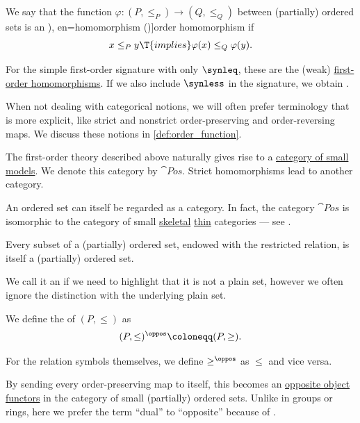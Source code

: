 \begin{definition}
\begin{thmenum}[resume=def:partially_ordered_set]
     We say that the function \( \varphi: (P, \leq_P) \to (Q, \leq_Q) \) between (partially) ordered sets is an \term[ru=порядковый гомоморфизм (\cite[92]{Гуров2013ТеорияРешёток}), en=homomorphism (\cite[\S 1.1.9.2]{Harzheim2005OrderedSets})]{order homomorphism} if
    \begin{equation}\label{eq:def:partially_ordered_set/morphism}
      x \leq_P y \T{implies} \varphi(x) \leq_Q \varphi(y).
    \end{equation}

    For the simple first-order signature with only \( {\synleq} \), these are the (weak) \hyperref[def:fol_homomorphism]{first-order homomorphisms}. If we also include \( {\synless} \) in the signature, we obtain .

    When not dealing with categorical notions, we will often prefer terminology that is more explicit, like strict and nonstrict order-preserving and order-reversing maps. We discuss these notions in \cref{def:order_function}.

     The first-order theory described above naturally gives rise to a \hyperref[def:fol_theory_model_functor/obj]{category of small models}. We denote this category by \( \cat{Pos} \). Strict homomorphisms lead to another category.

    An ordered set can itself be regarded as a category. In fact, the category \( \cat{Pos} \) is isomorphic to the category of small \hyperref[def:skeletal_category]{skeletal} \hyperref[def:thin_category]{thin} categories --- see .

    \mimprovised Every subset of a (partially) ordered set, endowed with the restricted relation, is itself a (partially) ordered set.

    We call it an  if we need to highlight that it is not a plain set, however we often ignore the distinction with the underlying plain set.

     We define the  of \( (P, \leq) \) as
    \begin{equation*}
      (P, \leq)^\oppos \coloneqq (P, \geq).
    \end{equation*}

    For the relation symbols themselves, we define \( \geq^\oppos \) as \( \leq \) and vice versa.

    By sending every order-preserving map to itself, this becomes an \hyperref[con:opposite_object]{opposite object functors} in the category of small (partially) ordered sets. Unlike in groups or rings, here we prefer the term \enquote{dual} to \enquote{opposite} because of .
  \end{thmenum}
\end{definition}
